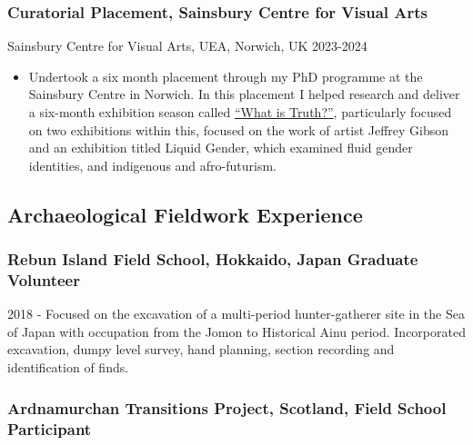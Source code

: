 \documentclass[11pt,a4paper]{article}
\providecommand{\tightlist}{%
  \setlength{\itemsep}{0pt}\setlength{\parskip}{0pt}}
\begin{document}
\subsubsection{Curatorial Placement, Sainsbury Centre for Visual
Arts}\label{curatorial-placement-sainsbury-centre-for-visual-arts}

Sainsbury Centre for Visual Arts, UEA, Norwich, UK 2023-2024

\begin{itemize}
\tightlist
\item
  Undertook a six month placement through my PhD programme at the
  Sainsbury Centre in Norwich. In this placement I helped research and
  deliver a six-month exhibition season called
  \href{https://www.sainsburycentre.ac.uk/whats-on/introducing-our-new-season-what-is-truth/}{``What
  is Truth?''}, particularly focused on two exhibitions within this,
  focused on the work of artist Jeffrey Gibson and an exhibition titled
  Liquid Gender, which examined fluid gender identities, and indigenous
  and afro-futurism.
\end{itemize}

\subsection{Archaeological Fieldwork
Experience}\label{archaeological-fieldwork-experience}

\subsubsection{\texorpdfstring{\textbf{Rebun Island Field School,
Hokkaido, Japan} Graduate
Volunteer}{Rebun Island Field School, Hokkaido, Japan Graduate Volunteer}}\label{rebun-island-field-school-hokkaido-japan-graduate-volunteer}

2018 - Focused on the excavation of a multi-period hunter-gatherer site
in the Sea of Japan with occupation from the Jomon to Historical Ainu
period. Incorporated excavation, dumpy level survey, hand planning,
section recording and identification of finds.

\subsubsection{\texorpdfstring{\textbf{Ardnamurchan Transitions Project,
Scotland,} Field School
Participant}{Ardnamurchan Transitions Project, Scotland, Field School Participant}}\label{ardnamurchan-transitions-project-scotland-field-school-participant}
\end{document}

